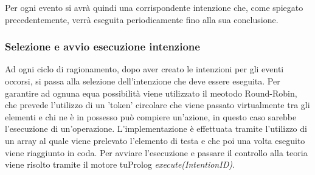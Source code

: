 \documentclass[12pt,a4paper,openright,twoside]{report}
\begin{document}
Per ogni evento si avr\`a quindi una corrispondente intenzione che, come spiegato precedentemente, verr\`a eseguita periodicamente fino alla sua conclusione.

\subsubsection{Selezione e avvio esecuzione intenzione}
Ad ogni ciclo di ragionamento, dopo aver creato le intenzioni per gli eventi occorsi, si passa alla selezione dell'intenzione che deve essere eseguita. Per garantire ad ognuna equa possibilit\`a viene utilizzato il meotodo Round-Robin, che prevede l'utilizzo di un 'token' circolare che viene passato virtualmente tra gli elementi e chi ne \`e in possesso pu\`o compiere un'azione, in questo caso sarebbe l'esecuzione di un'operazione.
L'implementazione \`e effettuata tramite l'utilizzo di un array al quale viene prelevato l'elemento di testa e che poi una volta eseguito viene riaggiunto in coda.
Per avviare l'esecuzione e passare il controllo alla teoria viene risolto tramite il motore tuProlog \textit{execute(IntentionID)}.
\end{document}
